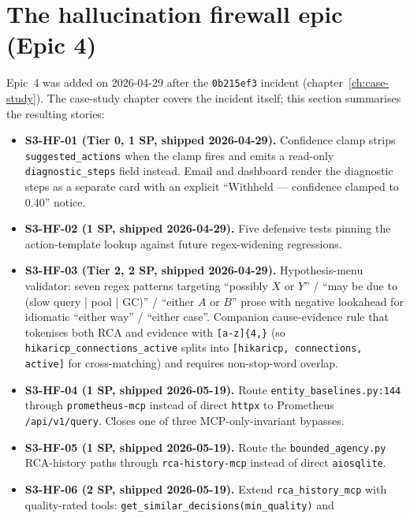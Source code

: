 \documentclass[11pt,a4paper,oneside]{report}
\begin{document}
\section{The hallucination firewall epic (Epic 4)}

Epic~4 was added on 2026-04-29 after the \texttt{0b215ef3} incident
(chapter~\ref{ch:case-study}).  The case-study chapter covers the
incident itself; this section summarises the resulting stories:

\begin{itemize}
  \item \textbf{S3-HF-01 (Tier 0, 1 SP, shipped 2026-04-29).}
        Confidence clamp strips \texttt{suggested\_actions} when the
        clamp fires and emits a read-only
        \texttt{diagnostic\_steps} field instead.  Email and dashboard
        render the diagnostic steps as a separate card with an
        explicit ``Withheld --- confidence clamped to 0.40'' notice.
  \item \textbf{S3-HF-02 (1 SP, shipped 2026-04-29).}  Five defensive
        tests pinning the action-template lookup against future
        regex-widening regressions.
  \item \textbf{S3-HF-03 (Tier 2, 2 SP, shipped 2026-04-29).}
        Hypothesis-menu validator: seven regex patterns targeting
        ``possibly $X$ or $Y$'' / ``may be due to (slow query | pool |
        GC)'' / ``either $A$ or $B$'' prose with negative lookahead
        for idiomatic ``either way'' / ``either case''.  Companion
        cause-evidence rule that tokenises both RCA and evidence with
        \texttt{[a-z]\{4,\}} (so
        \texttt{hikaricp\_connections\_active} splits into
        \texttt{[hikaricp, connections, active]} for cross-matching)
        and requires non-stop-word overlap.
  \item \textbf{S3-HF-04 (1 SP, shipped 2026-05-19).}  Route
        \texttt{entity\_baselines.py:144} through
        \texttt{prometheus-mcp} instead of direct \texttt{httpx} to
        Prometheus \texttt{/api/v1/query}.  Closes one of three
        MCP-only-invariant bypasses.
  \item \textbf{S3-HF-05 (1 SP, shipped 2026-05-19).}  Route the
        \texttt{bounded\_agency.py} RCA-history paths through
        \texttt{rca-history-mcp} instead of direct \texttt{aiosqlite}.
  \item \textbf{S3-HF-06 (2 SP, shipped 2026-05-19).}  Extend
        \texttt{rca\_history\_mcp} with quality-rated tools:
        \texttt{get\_similar\_decisions(min\_quality)} and

\end{itemize}
\end{document}
